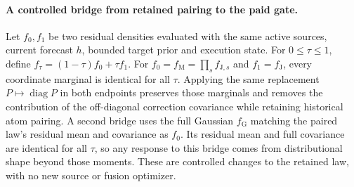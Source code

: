 \paragraph{A controlled bridge from retained pairing to the paid gate.}
Let $f_0,f_1$ be two residual densities evaluated with the same active
sources, current forecast $h$, bounded target prior and execution state.
For $0\leq\tau\leq1$, define $f_\tau=(1-\tau)f_0+\tau f_1$.
For $f_0=f_{\mathrm M}=\prod_s f_{\mathrm J,s}$ and
$f_1=f_{\mathrm J}$, every coordinate marginal is identical for all $\tau$.
Applying the same replacement $P\mapsto\operatorname{diag}P$ in both
endpoints preserves those marginals and removes the contribution of the
off-diagonal correction covariance while retaining historical atom pairing.
A second bridge uses the full Gaussian $f_{\mathrm G}$ matching the paired
law's residual mean and covariance as $f_0$.  Its residual mean and full
covariance are identical for all $\tau$, so any response to this bridge
comes from distributional shape beyond those moments.  These are controlled
changes to the retained law, with no new source or fusion optimizer.

